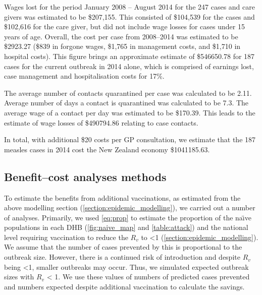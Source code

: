 \documentclass{article}
\begin{document}
Wages lost for the period January 2008 -- August 2014 for the 247 cases and care givers was estimated to be \$207,155. This consisted of \$104,539 for the cases and \$102,616 for the care giver, but did not include wage losses for cases under 15 years of age. Overall, the cost per case from 2008--2014 was estimated to be \$2923.27 (\$839 in forgone wages, \$1,765 in management costs, and \$1,710 in hospital costs). This figure brings an approximate estimate of \$546650.78 for 187 cases for the current outbreak in 2014 alone, which is comprised of earnings lost, case management and hospitalisation costs for 17\%.

The average number of contacts quarantined per case was calculated to be 2.11. Average number of days a contact is quarantined was calculated to be 7.3. The average wage of a contact per day was estimated to be \$170.39. This leads to the estimate of wage losses of \$490794.86 relating to case contacts.

In total, with additional \$20 costs per GP consultation, we estimate that the 187 measles cases in 2014 cost the New Zealand economy \$1041185.63.

\subsection{Benefit--cost analyses methods}
\label{sub:cost_benefit}

To estimate the benefits from additional vaccinations, as estimated from the above modelling section (\autoref{section:epidemic_modelling}), we carried out a number of analyses. Primarily, we used \autoref{eq:prop} to estimate the proportion of the na\"{\i}ve populations in each DHB (\autoref{fig:naive_map} and \autoref{table:attack}) and the national level requiring vaccination to reduce the $R_v$ to <1 (\autoref{section:epidemic_modelling}). We assume that the number of cases prevented by this is proportional to the outbreak size. However, there is a continued risk of introduction and despite $R_v$ being <1, smaller outbreaks may occur. Thus, we simulated expected outbreak sizes with $R_v$ < 1. We use these values of numbers of predicted cases prevented and numbers expected despite additional vaccination to calculate the savings. 
\end{document}
